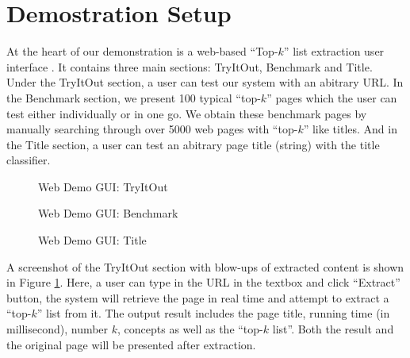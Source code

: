 \section{Demostration Setup}
\label{sec:demo}
At the heart of our demonstration is a web-based ``Top-$k$'' list
extraction user interface \cite{list-extractor}.
It contains three main sections: TryItOut, Benchmark and Title. 
Under the TryItOut section, a user can test our system with an abitrary URL.
In the Benchmark section, we present 100 typical ``top-$k$'' pages
which the user can test either individually or in one go. We obtain
these benchmark pages by manually searching through over 5000 web pages
with ``top-$k$'' like titles.
And in the Title section, a user can test an abitrary page title 
(string) with the title classifier.

\begin{figure}[th]
	\centering
\caption{Web Demo GUI: TryItOut}
\label{fig:gui}
\end{figure}

\begin{figure}[th]
	\centering
\caption{Web Demo GUI: Benchmark}
\label{fig:gui2}
\end{figure}

\begin{figure}[th]
	\centering
\caption{Web Demo GUI: Title}
\label{fig:gui3}
\end{figure}


A screenshot of the TryItOut section with blow-ups of extracted content
is shown in Figure \ref{fig:gui}.
Here, a user can type in the URL in the textbox and click ``Extract'' button, 
the system
will retrieve the page in real time and attempt to extract a ``top-$k$'' list from it. The output result includes
the page title, running time (in millisecond), number $k$, concepts as well as the ``top-$k$ list''. Both the
result and the original page will be presented after extraction.

